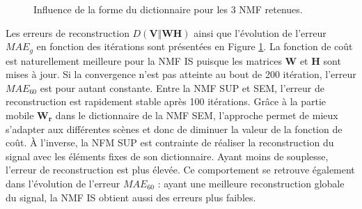 \begin{figure}[h!]
\centering
{}%
\qquad
{}%
\caption{Influence de la forme du dictionnaire pour les 3 NMF retenues.}
\label{fig:evolution_mae}
\end{figure}

Les erreurs de reconstruction $D(\mathbf{V} \Vert \mathbf{WH})$ ainsi que l'évolution de l'erreur $MAE_g$ en fonction des itérations sont présentées en Figure \ref{fig:evolution_mae}. La fonction de coût est naturellement meilleure pour la NMF IS puisque les matrices $\mathbf{W}$ et $\mathbf{H}$ sont mises à jour. Si la convergence n'est pas atteinte au bout de 200 itération, l'erreur $MAE_{60}$ est pour autant constante. Entre la NMF SUP et SEM, l'erreur de reconstruction est rapidement stable après 100 itérations. 
Grâce à la partie mobile $\mathbf{W_r}$ dans le dictionnaire de la NMF SEM, l'approche permet de mieux s'adapter aux différentes scènes et donc de diminuer la valeur de la fonction de coût. À l'inverse, la NFM SUP est contrainte de réaliser la reconstruction du signal avec les éléments fixes de son dictionnaire. Ayant moins de souplesse, l'erreur de reconstruction est plus élevée. Ce comportement se retrouve également dans l'évolution de l'erreur $MAE_{60}$ : ayant une meilleure reconstruction globale du signal, la NMF IS obtient aussi des erreurs plus faibles. 

